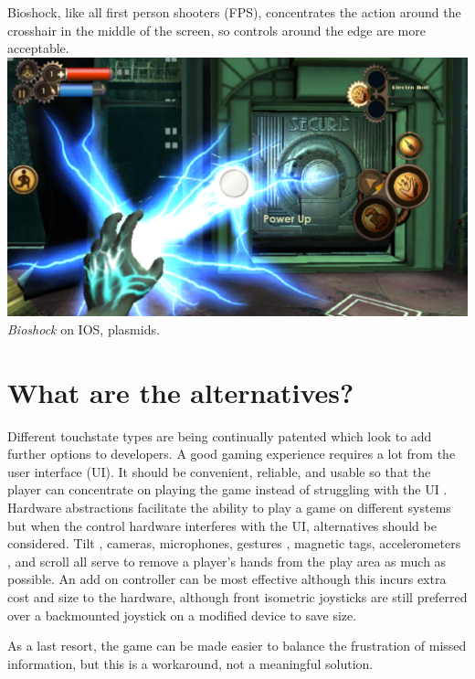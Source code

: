 \documentclass{scrartcl}
\begin{document}
Bioshock, like all first person shooters (FPS), concentrates the action around the crosshair in the middle of the screen, so controls around the edge are 
more acceptable.  \\

\includegraphics[scale = 0.3]{Bioshock_IOS_Plasmid}\\
{
    \emph{Bioshock} on IOS, plasmids.
}\\

\section*{What are the alternatives?}

Different touchstate types \cite{herz2010multi} are being continually patented which look to add further options to developers.  A good gaming experience requires a lot from the user interface (UI).  It should be convenient, reliable, and usable so that the player can concentrate on playing the game instead of struggling with the UI \cite {korhonen2006playability}.  Hardware abstractions facilitate the ability to play a game on different systems \cite{binsubaih2007survey} but when the control hardware interferes with the UI, alternatives should be considered.  Tilt \cite{gilbertson2008using}, cameras, microphones, gestures \cite{niezen2008gesture}, magnetic tags, accelerometers \cite{harrison2009abracadabra}, and scroll \cite{ballagas2006smart} all serve to remove a player's hands from the play area as much as possible.  An add on controller can be most effective although this incurs extra cost and size to the hardware, although front isometric joysticks are still preferred over a backmounted joystick \cite{wobbrock2007alternative} on a modified device to save size.

As a last resort, the game can be made easier to balance the frustration of missed information, but this is a workaround, not a meaningful solution.
\end{document}
